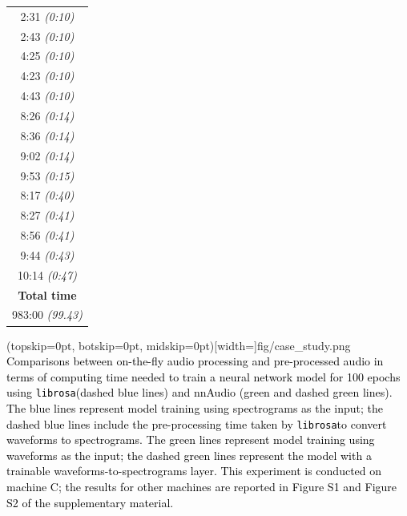 \documentclass{ieeeaccess}
\newcommand{\nbh}[1]{\texttt{#1}}
\newcommand{\newtext}[1]{\textcolor{black}{#1}} %
\begin{document}
\begin{table}[ht]
\begin{tabular}{c}
2:31 \textit{(0:10)} \\ 2:43 \textit{(0:10)}   \\4:25 \textit{(0:10)}  \\ 4:23 \textit{(0:10)} \\ 4:43 \textit{(0:10)}  \\ 8:26 \textit{(0:14)}  \\ 8:36 \textit{(0:14)} \\ 9:02 \textit{(0:14)} \\ 9:53 \textit{(0:15)}  \\ 8:17 \textit{(0:40)} \\ 8:27 \textit{(0:41)}   \\ 8:56 \textit{(0:41)}  \\ 9:44 \textit{(0:43)} \\ 10:14 \textit{(0:47)} \\ \midrule
\textbf{Total time} \\ 
983:00 \textit{(99.43)} \\ \bottomrule
\end{tabular}

\label{tab: input represtation example}
\end{table}

\Figure(topskip=0pt, botskip=0pt, midskip=0pt)[width=\linewidth]{fig/case_study.png}
{\newtext{Comparisons between on-the-fly audio processing and pre-processed audio in terms of computing time needed to train a neural network model for 100 epochs using \nbh{librosa}(dashed blue lines) and nnAudio (green and dashed green lines). The blue lines represent model training using spectrograms as the input; the dashed blue lines include the pre-processing time taken by \nbh{librosa}to convert waveforms to spectrograms. The green lines represent model training using waveforms as the input; the dashed green lines represent the model with a trainable waveforms-to-spectrograms layer. This experiment is conducted on machine C; the results for other machines are reported in Figure S1 and Figure S2 of the supplementary material. }\label{fig: case_study}}
\end{document}
